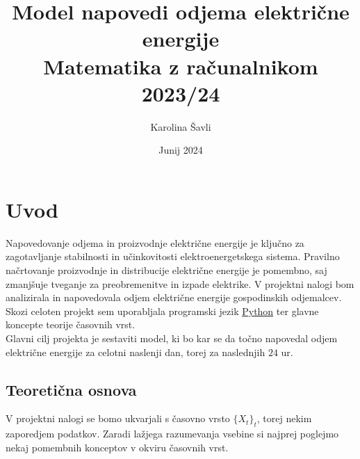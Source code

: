 \documentclass[a4paper, 11pt]{article}
\begin{document}
\title{\textbf{\LARGE{Model napovedi odjema električne energije}} \\ Matematika z računalnikom 2023/24}
\author{Karolina Šavli}
\date{Junij 2024}

\maketitle



\section{Uvod}

Napovedovanje odjema in proizvodnje električne energije je ključno za zagotavljanje stabilnosti in učinkovitosti elektroenergetskega sistema. 
Pravilno načrtovanje proizvodnje in distribucije električne energije je pomembno, saj zmanjšuje tveganje za 
preobremenitve in izpade elektrike. V projektni nalogi bom analizirala in napovedovala odjem električne 
energije gospodinskih odjemalcev. Skozi celoten projekt sem 
uporabljala programski jezik \href{https://www.python.org/}{Python} ter glavne koncepte teorije časovnih vrst. \\

\noindent Glavni cilj projekta je sestaviti model, ki bo kar se da točno napovedal odjem električne energije 
za celotni naslenji dan, torej za naslednjih $24$ ur.


\subsection{Teoretična osnova}

\noindent V projektni nalogi se bomo ukvarjali s časovno vrsto $\{X_t\}_t$, torej nekim zaporedjem podatkov. 
Zaradi lažjega razumevanja vsebine si najprej poglejmo
nekaj pomembnih konceptov v okviru časovnih vrst. \\
\end{document}
